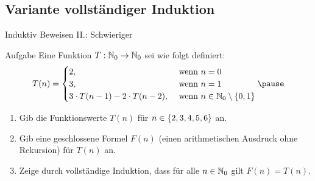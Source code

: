 \subsection{Variante vollständiger Induktion} %
\begin{frame}{Induktiv Beweisen II.: Schwieriger}
	\begin{exampleblock}{Aufgabe}
		Eine Funktion $T:\mathbb{N}_0 \rightarrow \mathbb{N}_0$ sei wie folgt definiert:
		\begin{equation*}
		T(n) = 
			\begin{cases}
			 2, &\text{ wenn } n=0 \\
			 3, &\text{ wenn } n=1 \\
			 3 \cdot T(n-1) - 2 \cdot T(n-2), &\text{ wenn }n \in \nN_0 \setminus \set{0,1}
		\end{cases} \pause
		\end{equation*}
		\begin{enumerate}
			\item Gib die Funktionswerte $T(n)$ für $n \in \{ 2,3,4,5,6 \}$ an.
			\item Gib eine geschlossene Formel $F(n)$ (einen arithmetischen Ausdruck ohne Rekursion) für $T(n)$ an.
			\item Zeige durch vollständige Induktion, dass für alle $n \in \mathbb{N}_0$ gilt $F(n) = T(n)$.
		\end{enumerate}
	\end{exampleblock}
\end{frame}

